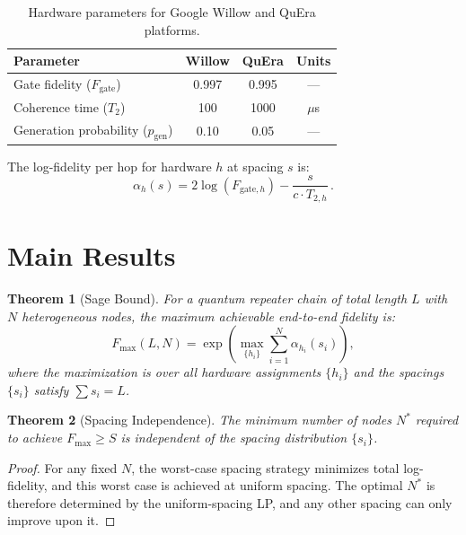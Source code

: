 \documentclass[aps,pra,reprint,amsmath,amssymb,superscriptaddress]{revtex4-2}
\newtheorem{theorem}{Theorem}
\begin{document}
\begin{table}[h]
\caption{Hardware parameters for Google Willow and QuEra platforms.}
\label{tab:hardware}
\begin{ruledtabular}
\begin{tabular}{lccc}
Parameter & Willow & QuEra & Units \\
\hline
Gate fidelity ($F_{\text{gate}}$) & 0.997 & 0.995 & --- \\
Coherence time ($T_2$) & 100 & 1000 & $\mu$s \\
Generation probability ($p_{\text{gen}}$) & 0.10 & 0.05 & --- \\
\end{tabular}
\end{ruledtabular}
\end{table}

The log-fidelity per hop for hardware $h$ at spacing $s$ is:
\begin{equation}
\alpha_h(s) = 2\log(F_{\text{gate},h}) - \frac{s}{c \cdot T_{2,h}} \,.
\label{eq:alpha}
\end{equation}


\section{Main Results}

\begin{theorem}[Sage Bound]
\label{thm:sage}
For a quantum repeater chain of total length $L$ with $N$ heterogeneous nodes, the maximum achievable end-to-end fidelity is:
\begin{equation}
F_{\max}(L, N) = \exp\!\left(\max_{\{h_i\}} \sum_{i=1}^{N} \alpha_{h_i}(s_i)\right) ,
\end{equation}
where the maximization is over all hardware assignments $\{h_i\}$ and the spacings $\{s_i\}$ satisfy $\sum s_i = L$.
\end{theorem}

\begin{theorem}[Spacing Independence]
\label{thm:spacing}
The minimum number of nodes $N^*$ required to achieve $F_{\max} \geq S$ is independent of the spacing distribution $\{s_i\}$.
\end{theorem}

\begin{proof}
For any fixed $N$, the worst-case spacing strategy minimizes total log-fidelity, and this worst case is achieved at uniform spacing. The optimal $N^*$ is therefore determined by the uniform-spacing LP, and any other spacing can only improve upon it.
\end{proof}
\end{document}
